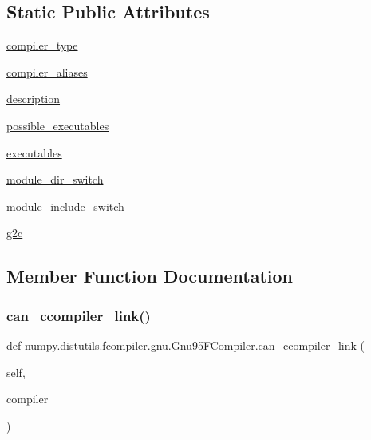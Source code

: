 \subsection*{Static Public Attributes}
\begin{DoxyCompactItemize}
\item 
\hyperlink{classnumpy_1_1distutils_1_1fcompiler_1_1gnu_1_1Gnu95FCompiler_acd5f937a745e3949bb65baaa88adc302}{compiler\+\_\+type}
\item 
\hyperlink{classnumpy_1_1distutils_1_1fcompiler_1_1gnu_1_1Gnu95FCompiler_a8eb4dc50cb99aab65548525d4fcc1b62}{compiler\+\_\+aliases}
\item 
\hyperlink{classnumpy_1_1distutils_1_1fcompiler_1_1gnu_1_1Gnu95FCompiler_ad37b475398e98847b2efa7a8662b6f23}{description}
\item 
\hyperlink{classnumpy_1_1distutils_1_1fcompiler_1_1gnu_1_1Gnu95FCompiler_ae8964c46b208a72fad7aff492e32532f}{possible\+\_\+executables}
\item 
\hyperlink{classnumpy_1_1distutils_1_1fcompiler_1_1gnu_1_1Gnu95FCompiler_a50ff530d432879980bd1795e70768a32}{executables}
\item 
\hyperlink{classnumpy_1_1distutils_1_1fcompiler_1_1gnu_1_1Gnu95FCompiler_a1fad2f828773d73f3db543b5ca6a64d1}{module\+\_\+dir\+\_\+switch}
\item 
\hyperlink{classnumpy_1_1distutils_1_1fcompiler_1_1gnu_1_1Gnu95FCompiler_a0269dbe1290df95f6778ddcd4d201a0b}{module\+\_\+include\+\_\+switch}
\item 
\hyperlink{classnumpy_1_1distutils_1_1fcompiler_1_1gnu_1_1Gnu95FCompiler_a1b3e194f260ffc6bfe79923ea8844cc1}{g2c}
\end{DoxyCompactItemize}


\subsection{Member Function Documentation}
\mbox{\label{classnumpy_1_1distutils_1_1fcompiler_1_1gnu_1_1Gnu95FCompiler_a1881a199376a5f4f4371b479dece5aa6}} 
\subsubsection{\texorpdfstring{can\+\_\+ccompiler\+\_\+link()}{can\_ccompiler\_link()}}
{\footnotesize\ttfamily def numpy.\+distutils.\+fcompiler.\+gnu.\+Gnu95\+F\+Compiler.\+can\+\_\+ccompiler\+\_\+link (\begin{DoxyParamCaption}\item[{}]{self,  }\item[{}]{compiler }\end{DoxyParamCaption})}


